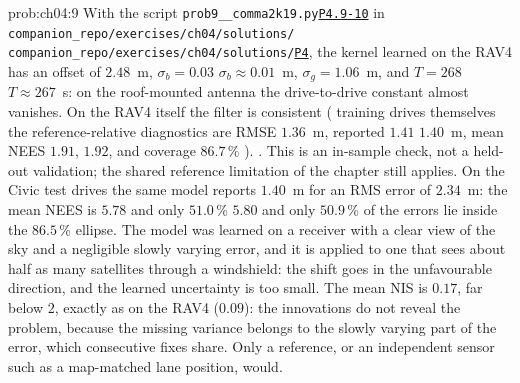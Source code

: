 \documentclass[graybox,envcountchap]{style/SNmono}
\newcommand{\repopath}[1]{\texttt{#1}}
\providecommand{\DIFadd}[1]{{\protect\color{blue} #1}} %
\providecommand{\DIFdel}[1]{{\protect\color{red} #1}} %
\providecommand{\DIFaddbegin}{} %
\providecommand{\DIFaddend}{} %
\providecommand{\DIFdelbegin}{} %
\providecommand{\DIFdelend}{} %
\DeclareRobustCommand{\RtwoDel}[1]{{\color{red}%
  \renewcommand{\DIFadd}[1]{##1}\renewcommand{\DIFdel}[1]{##1}%
  #1}}
\DeclareRobustCommand{\RtwoAdd}[1]{{\color{blue}#1}}
\DeclareRobustCommand{\codeentry}[1]{\hyperref[code:#1]{\texttt{#1}}}
\begin{document}
\begin{sol}{prob:ch04:9}
With the script \RtwoDel{\repopath{prob9\_\_\allowbreak comma2k19.py}}\RtwoAdd{\codeentry{P4.9-10}} in \DIFdelbegin \DIFdel{\repopath{companion\_\allowbreak repo/\allowbreak exercises/\allowbreak ch04/\allowbreak solutions/}}\DIFdelend \DIFaddbegin \DIFadd{\RtwoDel{\repopath{companion\_\allowbreak repo/\allowbreak exercises/\allowbreak ch04/\allowbreak solutions/\allowbreak }}\RtwoAdd{\codeentry{P4}}}\DIFaddend , the kernel learned on the RAV4 has an offset of $2.48$~m, \DIFdelbegin \DIFdel{$\sigma_b=0.03$}\DIFdelend \DIFaddbegin \DIFadd{$\sigma_b\approx0.01$}\DIFaddend ~m, $\sigma_g=1.06$~m, and \DIFdelbegin \DIFdel{$T=268$}\DIFdelend \DIFaddbegin \DIFadd{$T\approx267$}\DIFaddend ~s: on the roof-mounted antenna the drive-to-drive constant almost vanishes. On the RAV4 \DIFdelbegin \DIFdel{itself the filter is consistent (}\DIFdelend \DIFaddbegin \DIFadd{training drives themselves the reference-relative diagnostics are }\DIFaddend RMSE $1.36$~m, reported \DIFdelbegin \DIFdel{$1.41$}\DIFdelend \DIFaddbegin \DIFadd{$1.40$}\DIFaddend ~m, mean NEES \DIFdelbegin \DIFdel{$1.91$, }\DIFdelend \DIFaddbegin \DIFadd{$1.92$, and }\DIFaddend coverage $86.7\,\%$\DIFdelbegin \DIFdel{). }\DIFdelend \DIFaddbegin \DIFadd{. This is an in-sample check, not a held-out validation; the shared reference limitation of the chapter still applies. }\DIFaddend On the Civic test drives the same model reports $1.40$~m for an RMS error of $2.34$~m: the mean NEES is \DIFdelbegin \DIFdel{$5.78$ and only $51.0\,\%$ }\DIFdelend \DIFaddbegin \DIFadd{$5.80$ and only $50.9\,\%$ }\DIFaddend of the errors lie inside the $86.5\,\%$ ellipse. The model was learned on a receiver with a clear view of the sky and a negligible slowly varying error, and it is applied to one that sees about half as many satellites through a windshield: the shift goes in the unfavourable direction, and the learned uncertainty is too small. The mean NIS is $0.17$, far below $2$, exactly as on the RAV4 ($0.09$): the innovations do not reveal the problem, because the missing variance belongs to the slowly varying part of the error, which consecutive fixes share. Only a reference, or an independent sensor such as a map-matched lane position, would.
\end{sol}
\end{document}
